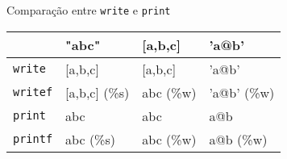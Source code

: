 
\begin{frame}{Comparação entre \texttt{write} e \texttt{print}}
    
    \begin{table}[h]
        \centering
        \begin{tabular}{|l|l|l|l|}
            \hline
             & "abc" & [a,b,c] & 'a@b'\\
            \hline
            \texttt{write}   & [a,b,c] & [a,b,c] & 'a@b' \\
            \hline
            \texttt{writef}  & [a,b,c] (\%s) & abc (\%w) & 'a@b' (\%w) \\
            \hline
            \texttt{print}   & abc & abc & a@b \\
            \hline
            \texttt{printf}  & abc (\%s) & abc (\%w) & a@b (\%w) \\ 
            \hline
        \end{tabular}
    \end{table}
    
\end{frame}


